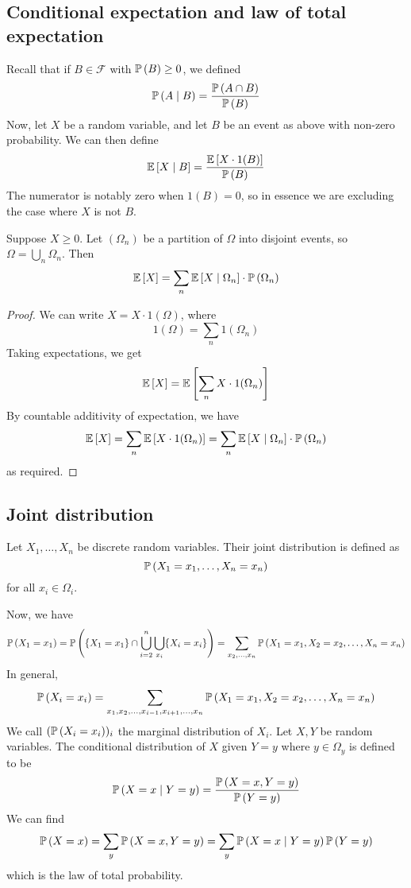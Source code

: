 \subsection{Conditional expectation and law of total expectation}
Recall that if \(B \in \mathcal F\) with \(\mathbb{P}\left({B}\right) \geq 0\), we defined
\[
	\mathbb{P}\left({A \mid B}\right) = \frac{\mathbb{P}\left({A \cap B}\right)}{\mathbb{P}\left({B}\right)}
\]
Now, let \(X\) be a random variable, and let \(B\) be an event as above with non-zero probability.
We can then define
\[
	\mathbb{E}\left[{X \mid B}\right] = \frac{\mathbb{E}\left[{X \cdot 1(B)}\right]}{\mathbb{P}\left({B}\right)}
\]
The numerator is notably zero when \(1(B) = 0\), so in essence we are excluding the case where \(X\) is not \(B\).
\begin{theorem}
	Suppose \(X \geq 0\).
	Let \((\Omega_n)\) be a partition of \(\Omega\) into disjoint events, so \(\Omega = \bigcup_n \Omega_n\).
	Then
	\[
		\mathbb{E}\left[{X}\right] = \sum_n \mathbb{E}\left[{X \mid \Omega_n}\right] \cdot \mathbb{P}\left({\Omega_n}\right)
	\]
\end{theorem}
\begin{proof}
	We can write \(X = X \cdot 1(\Omega)\), where
	\[
		1(\Omega) = \sum_n 1(\Omega_n)
	\]
	Taking expectations, we get
	\[
		\mathbb{E}\left[{X}\right] = \mathbb{E}\left[{ \sum_{n} X \cdot 1(\Omega_n) }\right]
	\]
	By countable additivity of expectation, we have
	\[
		\mathbb{E}\left[{X}\right] = \sum_{n} \mathbb{E}\left[{ X \cdot 1(\Omega_n) }\right] = \sum_n \mathbb{E}\left[{X \mid \Omega_n}\right] \cdot \mathbb{P}\left({\Omega_n}\right)
	\]
	as required.
\end{proof}

\subsection{Joint distribution}
\begin{definition}
	Let \(X_1, \dots, X_n\) be discrete random variables.
	Their joint distribution is defined as
	\[
		\mathbb{P}\left({X_1 = x_1, \dots, X_n = x_n}\right)
	\]
	for all \(x_i \in \Omega_i\).
\end{definition}
\noindent Now, we have
\[
	\mathbb{P}\left({X_1 = x_1}\right) = \mathbb{P}\left({\{ X_1 = x_1\} \cap \bigcup_{i=2}^n \bigcup_{x_i} \{ X_i = x_i \} }\right) = \sum_{x_2, \dots, x_n} \mathbb{P}\left({X_1 = x_1, X_2 = x_2, \dots, X_n = x_n}\right)
\]
In general,
\[
	\mathbb{P}\left({X_i = x_i}\right) = \sum_{x_1, x_2, \dots, x_{i-1}, x_{i+1}, \dots, x_n} \mathbb{P}\left({X_1 = x_1, X_2 = x_2, \dots, X_n = x_n}\right)
\]
We call \((\mathbb{P}\left({X_i = x_i}\right))_i\) the marginal distribution of \(X_i\).
Let \(X, Y\) be random variables.
The conditional distribution of \(X\) given \(Y = y\) where \(y \in \Omega_y\) is defined to be
\[
	\mathbb{P}\left({X = x \mid Y = y}\right) = \frac{\mathbb{P}\left({X = x, Y = y}\right)}{\mathbb{P}\left({Y = y}\right)}
\]
We can find
\[
	\mathbb{P}\left({X = x}\right) = \sum_y \mathbb{P}\left({X = x, Y = y}\right) = \sum_y \mathbb{P}\left({X = x \mid Y = y}\right) \mathbb{P}\left({Y = y}\right)
\]
which is the law of total probability.

